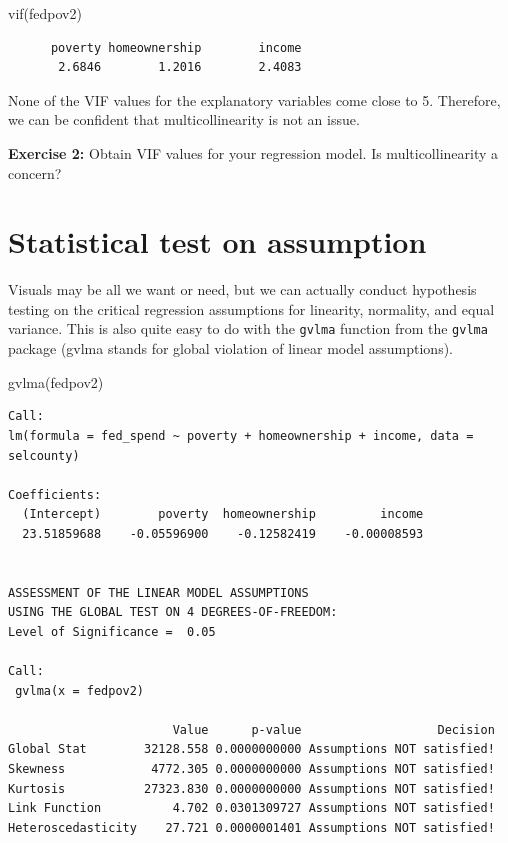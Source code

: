 \documentclass[
]{book}
\makeatletter
\newenvironment{Shaded}{\begin{snugshade}}{\end{snugshade}}
\newcommand{\FunctionTok}[1]{\textcolor[rgb]{0,0,0}{#1}}
\newcommand{\NormalTok}[1]{#1}
\newenvironment{kframe}{%
\medskip{}
\setlength{\fboxsep}{.8em}
 \def\at@end@of@kframe{}%
 \ifinner\ifhmode%
  \def\at@end@of@kframe{\end{minipage}}%
  \begin{minipage}{\columnwidth}%
 \fi\fi%
 \def\FrameCommand##1{\hskip\@totalleftmargin \hskip-\fboxsep
 \colorbox{shadecolor}{##1}\hskip-\fboxsep
     \hskip-\linewidth \hskip-\@totalleftmargin \hskip\columnwidth}%
 \MakeFramed {\advance\hsize-\width
   \@totalleftmargin\z@ \linewidth\hsize
   \@setminipage}}%
 {\par\unskip\endMakeFramed%
 \at@end@of@kframe}
\renewenvironment{Shaded}{\begin{kframe}}{\end{kframe}}
\newenvironment{rmdblock}[1]
  {\begin{shaded*}
  }
  {\end{shaded*}
  }
\newenvironment{learncheck}
  {\begin{rmdblock}{warning}}
  {\end{rmdblock}}
\makeatother
\begin{document}
\begin{Shaded}
\begin{Highlighting}[]
\FunctionTok{vif}\NormalTok{(fedpov2)}
\end{Highlighting}
\end{Shaded}

\begin{verbatim}
      poverty homeownership        income 
       2.6846        1.2016        2.4083 
\end{verbatim}

None of the VIF values for the explanatory variables come close to 5. Therefore, we can be confident that multicollinearity is not an issue.

\begin{learncheck}
\textbf{Exercise 2:} Obtain VIF values for your regression model. Is
multicollinearity a concern?
\end{learncheck}

\hypertarget{statistical-test-on-assumption}{%
\section{Statistical test on assumption}\label{statistical-test-on-assumption}}

Visuals may be all we want or need, but we can actually conduct hypothesis testing on the critical regression assumptions for linearity, normality, and equal variance. This is also quite easy to do with the \texttt{gvlma} function from the \texttt{gvlma} package (gvlma stands for global violation of linear model assumptions).

\begin{Shaded}
\begin{Highlighting}[]
\FunctionTok{gvlma}\NormalTok{(fedpov2)}
\end{Highlighting}
\end{Shaded}

\begin{verbatim}
Call:
lm(formula = fed_spend ~ poverty + homeownership + income, data = selcounty)

Coefficients:
  (Intercept)        poverty  homeownership         income  
  23.51859688    -0.05596900    -0.12582419    -0.00008593  


ASSESSMENT OF THE LINEAR MODEL ASSUMPTIONS
USING THE GLOBAL TEST ON 4 DEGREES-OF-FREEDOM:
Level of Significance =  0.05 

Call:
 gvlma(x = fedpov2) 

                       Value      p-value                   Decision
Global Stat        32128.558 0.0000000000 Assumptions NOT satisfied!
Skewness            4772.305 0.0000000000 Assumptions NOT satisfied!
Kurtosis           27323.830 0.0000000000 Assumptions NOT satisfied!
Link Function          4.702 0.0301309727 Assumptions NOT satisfied!
Heteroscedasticity    27.721 0.0000001401 Assumptions NOT satisfied!
\end{verbatim}
\end{document}
